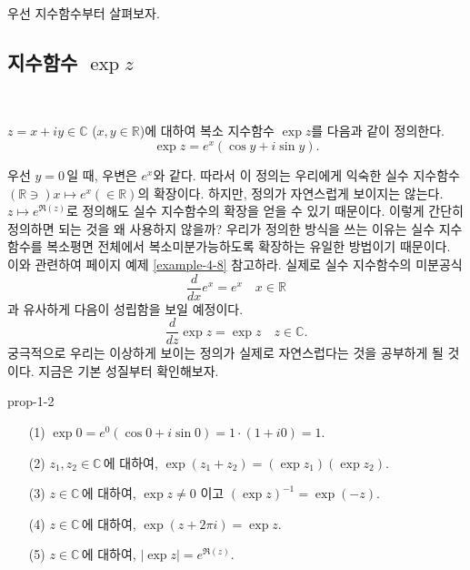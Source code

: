 우선  지수함수부터 살펴보자.


\subsection{지수함수 $\exp z$} \label{sec-1-4-1}

\

\begin{saltdefinition}[복소 지수함수] {}{} \label{def-1-2}
$z=x+iy\in \mathbb C$ ($x,y\in\mathbb R$)에 대하여
복소 지수함수 $\exp z$를 다음과 같이 정의한다.
$$
\exp z = e^x(\cos y +i\sin y).
$$
\end{saltdefinition}

우선 $y=0$\,일 때, 우변은 $e^x$와 같다. 따라서 이 정의는
우리에게 익숙한 실수 지수함수 $(\mathbb R \ni) x \mapsto e^x (\in \mathbb R)$의 확장이다.
하지만, 정의가 자연스럽게 보이지는 않는다. 
$z\mapsto e^{\Re(z)}$로 정의해도 실수 지수함수의 확장을 얻을 수 있기 때문이다.
이렇게 간단히 정의하면 되는 것을 왜 사용하지 않을까?
우리가 정의한 방식을 쓰는 이유는
실수 지수함수를 복소평면 전체에서 복소미분가능하도록
확장하는 유일한 방법이기 때문이다. 
이와 관련하여 
\pageref{ex-page-4-8}페이지 %
예제 \ref{example-4-8}\를%
참고하라.
실제로 실수 지수함수의 미분공식
$$
\dfrac{d}{dx}e^x  = e^x \quad x\in\mathbb R
$$
과 유사하게 다음이 성립함을 보일 예정이다.
$$
\dfrac{d}{dz} \exp z  = \exp z \quad z\in\mathbb C.
$$
궁극적으로 우리는 이상하게 보이는 정의가 실제로 자연스럽다는 것을 공부하게 될 것이다.
지금은 기본 성질부터 확인해보자.


\begin{saltprop} {prop-1-2} {} %
\begin{itemize}
\item[(1)] $\exp 0 = e^0(\cos 0 + i\sin 0) = 1\cdot(1+i0) = 1$.
\item[(2)] $z_1, z_2\in \mathbb C\,$에 대하여, $\exp(z_1+z_2) = (\exp z_1)(\exp z_2)$.
\item[(3)] $z \in \mathbb C\,$에 대하여, $\exp z \ne 0$ 이고 $(\exp z)^{-1} = \exp (-z)$.
\item[(4)] $z \in \mathbb C\,$에 대하여, $\exp(z+2\pi i) = \exp z$.
\item[(5)] $z \in \mathbb C\,$에 대하여, $|\exp z| = e^{\Re(z)}$.
\end{itemize}
\  %
\end{saltprop}

